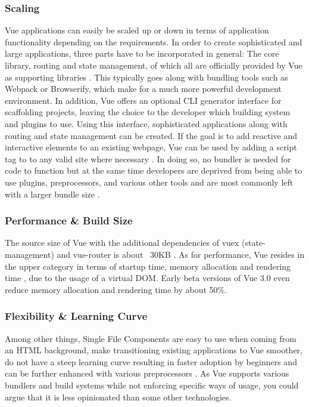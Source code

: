 \subsubsection{Scaling}
Vue applications can easily be scaled up or down in terms of application functionality depending on the requirements. In order to create sophisticated and large applications, three parts have to be incorporated in general: The core library, routing and state management, of which all are officially provided by Vue as supporting libraries \cite{ComparisonVue:online}. This typically goes along with bundling tools such as Webpack or Browserify, which make for a much more powerful development environment. In addition, Vue offers an optional CLI generator interface for scaffolding projects, leaving the choice to the developer which building system and plugins to use. Using this interface, sophisticated applications along with routing and state management can be created. If the goal is to add reactive and interactive elements to an existing webpage, Vue can be used by adding a script tag to to any valid site where necessary \cites{AddingReact:online, ComparisonVue:online}. In doing so, no bundler is needed for code to function but at the same time developers are deprived from being able to use plugins, preprocessors, and various other tools and are most commonly left with a larger bundle size \cite{ComparisonVue:online}.

\subsubsection{Performance \& Build Size}
The source size of Vue with the additional dependencies of vuex (state-management) and vue-router is about ~30KB \cite{ComparisonVue:online}. As for performance, Vue resides in the upper category in terms of startup time, memory allocation and rendering time \cite{FrameworksPerformance:online}, due to the usage of a virtual DOM. Early beta versions of Vue 3.0 even reduce memory allocation and rendering time by about 50\%.

\subsubsection{Flexibility \& Learning Curve}
Among other things, Single File Components are easy to use when coming from an HTML background, make transitioning existing applications to Vue smoother, do not have a steep learning curve resulting in faster adoption by beginners and can be further enhanced with various preprocessors \cite{ComparisonVue:online}. As Vue supports various bundlers and build systems while not enforcing specific ways of usage, you could argue that it is less opinionated than some other technologies. 

